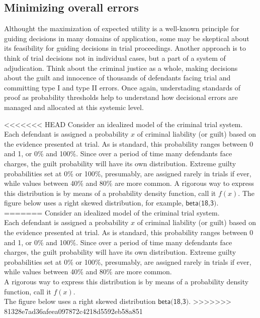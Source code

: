 \documentclass[10pt,dvipsnames,enabledeprecatedfontcommands]{scrartcl}
\begin{document}
\subsection{Minimizing overall errors}

Althought the maximization of expected utility is a well-known principle
for guiding decisions in many domains of application, some may be
skeptical about its feasibility for guiding decisions in trial
proceedings. Another approach is to think of trial decisions not in
individual cases, but a part of a system of adjudication. Think about
the criminal justice as a whole, making decisions about the guilt and
innocence of thousands of defendants facing trial and committing type I
and type II errors. Once again, understading standards of proof as
probability thresholds help to understand how decisional errors are
managed and allocated at this systemic level.

<<<<<<< HEAD
Consider an idealized model of the criminal trial system. Each defendant
is assigned a probability \(x\) of criminal liability (or guilt) based
on the evidence presented at trial. As is standard, this probability
ranges between 0 and 1, or 0\% and 100\%. Since over a period of time
many defendants face charges, the guilt probability will have its own
distribution. Extreme guilty probabilities set at 0\% or 100\%,
presumably, are assigned rarely in trials if ever, while values between
40\% and 80\% are more common. A rigorous way to express this
distribution is by means of a probability density function, call it
\(f(x)\). The figure below uses a right skewed distribution, for
example, \(\textsf{beta(18,3)}\).
=======
Consider an idealized model of the criminal trial system.\\
Each defendant is assigned a probability \(x\) of criminal liability (or
guilt) based on the evidence presented at trial. As is standard, this
probability ranges between 0 and 1, or 0\% and 100\%. Since over a
period of time many defendants face charges, the guilt probability will
have its own distribution. Extreme guilty probabilities set at 0\% or
100\%, presumably, are assigned rarely in trials if ever, while values
between 40\% and 80\% are more common.\\
A rigorous way to express this distribution is by means of a probability
density function, call it \(f(x)\).\\
The figure below uses a right skewed distribution
\(\textsf{beta(18,3)}\).
>>>>>>> 81328e7ad36afeea097872c4218d5592eb58a851
\end{document}
